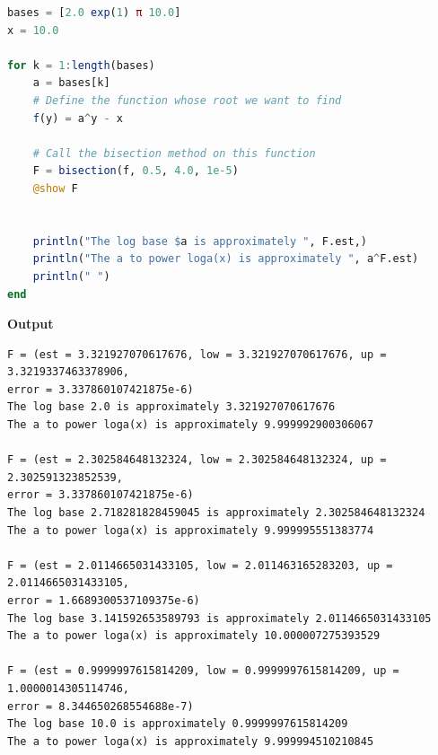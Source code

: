 \begin{lstlisting}[language=Julia,style=mystyle]
bases = [2.0 exp(1) π 10.0]
x = 10.0

for k = 1:length(bases)
    a = bases[k]
    # Define the function whose root we want to find
    f(y) = a^y - x

    # Call the bisection method on this function
    F = bisection(f, 0.5, 4.0, 1e-5)
    @show F

    
    println("The log base $a is approximately ", F.est,)
    println("The a to power loga(x) is approximately ", a^F.est)
    println(" ")
end
\end{lstlisting}
\textbf{Output} 
\begin{verbatim}
F = (est = 3.321927070617676, low = 3.321927070617676, up = 3.3219337463378906, 
error = 3.337860107421875e-6)
The log base 2.0 is approximately 3.321927070617676
The a to power loga(x) is approximately 9.999992900306067
 
F = (est = 2.302584648132324, low = 2.302584648132324, up = 2.302591323852539, 
error = 3.337860107421875e-6)
The log base 2.718281828459045 is approximately 2.302584648132324
The a to power loga(x) is approximately 9.999995551383774
 
F = (est = 2.0114665031433105, low = 2.011463165283203, up = 2.0114665031433105, 
error = 1.6689300537109375e-6)
The log base 3.141592653589793 is approximately 2.0114665031433105
The a to power loga(x) is approximately 10.000007275393529
 
F = (est = 0.9999997615814209, low = 0.9999997615814209, up = 1.0000014305114746, 
error = 8.344650268554688e-7)
The log base 10.0 is approximately 0.9999997615814209
The a to power loga(x) is approximately 9.999994510210845
\end{verbatim}




\Qed



